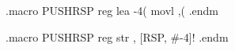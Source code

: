 .macro PUSHRSP reg
lea -4(%
movl \reg,(%
.endm
  
.macro PUSHRSP reg
str     \reg, [RSP, #-4]!
.endm
